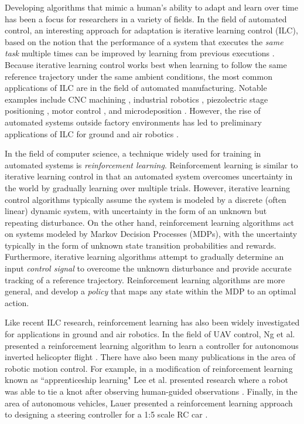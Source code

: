 Developing algorithms that mimic a human's ability to adapt and learn over time has been a focus for researchers in a variety
of fields. In the field of automated control, an interesting approach for adaptation is iterative learning control (ILC), based
on the notion that the performance of a system that executes the
\textit{same task} multiple times can be improved by learning from previous executions \cite{bristow}.
Because iterative learning control works best when learning to follow the same reference trajectory under the same ambient conditions, the most common applications
of ILC are in the field of automated manufacturing. Notable examples include CNC machining \cite{kimdi}, industrial robotics \cite{freeman}\cite{hladowski}, piezolectric stage
positioning \cite{huang}, motor control \cite{mohammad}, and microdeposition \cite{hoelzle}. However, the rise of automated systems outside
factory environments has led to preliminary applications of ILC for ground and air robotics \cite{chen}\cite{purwin}\cite{sun}.

 In the field of computer science, a technique widely used for training in automated systems is \textit{reinforcement learning}.
 Reinforcement learning is similar to iterative learning control in that an automated system overcomes uncertainty in the world by
 gradually learning over multiple trials. However, iterative learning control algorithms typically assume the system is modeled by a 
 discrete (often linear) dynamic system, with uncertainty in the form of an unknown but repeating disturbance. On the other hand, 
 reinforcement learning algorithms act on systems modeled by Markov Decision Processes (MDPs), with the uncertainty typically in
 the form of unknown state transition probabilities and rewards. Furthermore, iterative learning algorithms attempt to gradually
 determine an input \textit{control signal} to overcome the unknown disturbance and provide accurate tracking of a reference trajectory. 
 Reinforcement learning algorithms are more general, and develop a \textit{policy} that maps any state within the MDP to
 an optimal action. 

 Like recent ILC research, reinforcement learning has also been widely investigated for applications in ground and air robotics. 
 In the field of UAV control, Ng et al. presented a reinforcement learning algorithm to learn
a controller for autonomous inverted helicopter flight \cite{ng2006}. There have also
been many publications in the area of robotic motion control. For example, in a modification
of reinforcement learning known as ``apprenticeship learning" Lee et al. presented research
where a robot was able to tie a knot after observing human-guided observations \cite{abbeel}. Finally, in the
area of autonomous vehicles, Lauer presented a reinforcement learning approach to designing a steering
controller for a 1:5 scale RC car \cite{lauer}.

